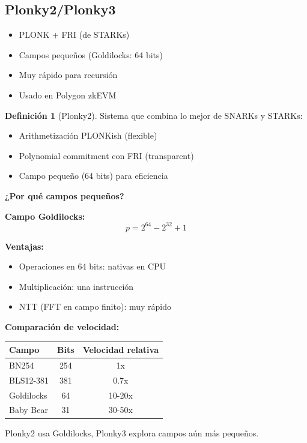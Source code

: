 \documentclass[11pt,a4paper,twoside,openright]{book}
\theoremstyle{definition}
\newtheorem{definition}{Definición}[chapter]
\theoremstyle{plain}
\theoremstyle{remark}
\begin{document}
\subsection{Plonky2/Plonky3}

\begin{itemize}
    \item PLONK + FRI (de STARKs)
    \item Campos pequeños (Goldilocks: 64 bits)
    \item Muy rápido para recursión
    \item Usado en Polygon zkEVM
\end{itemize}

\begin{definition}[Plonky2]
Sistema que combina lo mejor de SNARKs y STARKs:
\begin{itemize}
    \item Arithmetización PLONKish (flexible)
    \item Polynomial commitment con FRI (transparent)
    \item Campo pequeño (64 bits) para eficiencia
\end{itemize}
\end{definition}

\begin{mathnote}
\textbf{¿Por qué campos pequeños?}

\textbf{Campo Goldilocks:}
\[ p = 2^{64} - 2^{32} + 1 \]

\textbf{Ventajas:}
\begin{itemize}
    \item Operaciones en 64 bits: nativas en CPU
    \item Multiplicación: una instrucción
    \item NTT (FFT en campo finito): muy rápido
\end{itemize}

\textbf{Comparación de velocidad:}
\begin{center}
\begin{tabular}{lcc}
\toprule
\textbf{Campo} & \textbf{Bits} & \textbf{Velocidad relativa} \\
\midrule
BN254 & 254 & 1x \\
BLS12-381 & 381 & 0.7x \\
Goldilocks & 64 & 10-20x \\
Baby Bear & 31 & 30-50x \\
\bottomrule
\end{tabular}
\end{center}

Plonky2 usa Goldilocks, Plonky3 explora campos aún más pequeños.
\end{mathnote}
\end{document}
